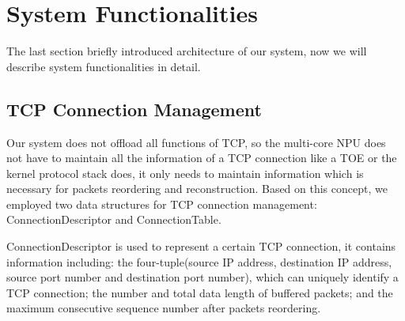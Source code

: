 \documentclass[conference]{IEEEtran}
\begin{document}
\section{System Functionalities}
The last section briefly introduced architecture of our system, now we will describe system functionalities in detail.
\subsection{TCP Connection Management}
Our system does not offload all functions of TCP, so the multi-core NPU does not have to maintain all the information of a TCP connection like a TOE or the kernel protocol stack does, it only needs to maintain information which is necessary for packets reordering and reconstruction. Based on this concept, we employed two data structures for TCP connection management: ConnectionDescriptor and ConnectionTable.

ConnectionDescriptor is used to represent a certain TCP connection, it contains information including: the four-tuple(source IP address, destination IP address, source port number and destination port number), which can uniquely identify a TCP connection; the number and total data length of buffered packets; and the maximum consecutive sequence number after packets reordering.
\end{document}
